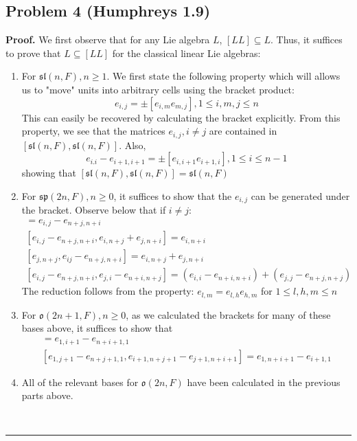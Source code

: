 \documentclass[12pt]{article}%
\newenvironment{proof}[1][Proof]{\textbf{#1.} }{\ \rule{0.5em}{0.5em}}
\begin{document}
\subsection*{Problem 4 (Humphreys 1.9)}
  \begin{proof}
    We first observe that for any Lie algebra $L$, $[LL] \subseteq L$. Thus, it suffices to prove that $L \subseteq [LL]$ for the classical linear Lie algebras:
      \begin{enumerate}
        \item For $\mathfrak{sl}(n,F),n\geq 1$. We first state the following property which will allows us to "move" units into arbitrary cells using the bracket product:
        $$ e_{i,j} = \pm [e_{i,m}e_{m,j}], 1 \leq i,m,j \leq n$$
        This can easily be recovered by calculating the bracket explicitly. From this property, we see that the matrices $e_{i,j}, i \neq j$ are contained in $[\mathfrak{sl}(n,F),\mathfrak{sl}(n,F)]$. Also,
        $$ e_{i.i} - e_{i+1,i+1} = \pm [e_{i,i+1}e_{i+1,i}], 1 \leq i \leq n-1 $$ showing that $[\mathfrak{sl}(n,F),\mathfrak{sl}(n,F)] = \mathfrak{sl}(n,F)$
        \item For $\mathfrak{sp}(2 n,F),n\geq 0$, it suffices to show that the $e_{i,j}$ can be generated under the bracket. Observe below that if $i \neq j$:
        \begin{gather}
          [e_{i,i} - e_{n+i,n+i},e_{i,j} - e_{n+j,n+i}] = e_{i,j} - e_{n + j,n + i} \\
          [e_{i,j} - e_{n+j,n+i},e_{i,n+j} + e_{j,n+i}] = e_{i,n+i} \\
          [e_{j,n+j},e_{ij} - e_{n+j,n+i}] = e_{i,n+j} + e_{j,n+i} \\
          [e_{i,j} - e_{n+j,n+i},e_{j,i} - e_{n+i,n+j}] = (e_{i,i} - e_{n+i,n+i}) + (e_{j,j} - e_{n+j,n+j})
        \end{gather} The reduction follows from the property: $e_{l,m} = e_{l,h}e_{h,m}$ for $1 \leq l,h,m \leq n$

        \item For $\mathfrak{o}(2n+1,F),n\geq 0$,
        as we calculated the brackets for many of these bases above, it suffices to show that
        \begin{gather}
          [e_{1,n+j+1}-e_{j+1,1},e_{n+i+1,j+1} - e_{n+j+1,i+1}] = e_{1,i+1} - e_{n+i+1,1} \\
          [e_{1,j+1} - e_{ n+ j+1,1},e_{i+1,n+j+1} - e_{j+1,n+i+1}] = e_{1,n+i+1} - e_{i+1,1}
        \end{gather}

        \item All of the relevant bases for $\mathfrak{o}(2n,F)$ have been calculated in the previous parts above.

      \end{enumerate}

  \end{proof}
\end{document}
